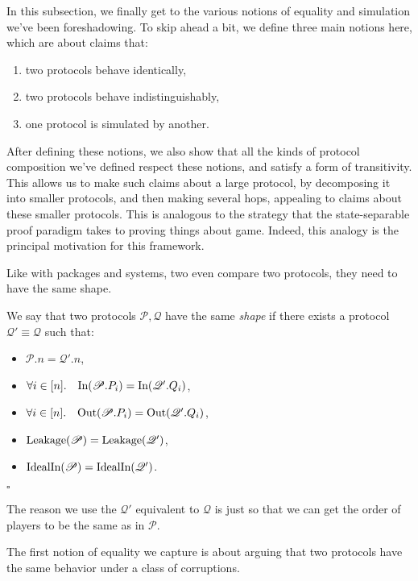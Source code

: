 In this subsection, we finally get to the various notions
of equality and simulation we've been foreshadowing.
To skip ahead a bit, we define three main notions here, which
are about claims that:
\begin{enumerate}
  \item two protocols behave identically,
  \item two protocols behave indistinguishably,
  \item one protocol is simulated by another.
\end{enumerate}
After defining these notions, we also show that all the kinds
of protocol composition we've defined respect these notions,
and satisfy a form of transitivity.
This allows us to make such claims about a large protocol,
by decomposing it into smaller protocols, and then making
several hops, appealing to claims about these smaller protocols.
This is analogous to the strategy that the state-separable proof
paradigm takes to proving things about game.
Indeed, this analogy is the principal motivation for this framework.

Like with packages and systems, two even compare two protocols,
they need to have the same shape.

\begin{definition}[Shape]
  \label{def:shape}
  We say that two protocols $\mathscr{P}, \mathscr{Q}$ have the same \emph{shape}
  if there exists a protocol $\mathscr{Q}' \equiv \mathscr{Q}$ such that:
  \begin{itemize}
    \item $\mathscr{P}.n = \mathscr{Q}'.n$,
    \item $\forall i \in [n].\quad \text{In}(\mathscr{P}.P_i) = \text{In}(\mathscr{Q}'.Q_i)$,
    \item $\forall i \in [n].\quad \text{Out}(\mathscr{P}.P_i) = \text{Out}(\mathscr{Q}'.Q_i)$,
    \item $\text{Leakage}(\mathscr{P}) = \text{Leakage}(\mathscr{Q}')$,
    \item $\text{IdealIn}(\mathscr{P}) = \text{IdealIn}(\mathscr{Q}')$.
  \end{itemize}

  $\square$
\end{definition}

The reason we use the $\mathscr{Q}'$ equivalent to $\mathscr{Q}$
is just so that we can get the order of players to be the same
as in $\mathscr{P}$.

The first notion of equality we capture is about arguing
that two protocols have the same behavior under a class of corruptions.

